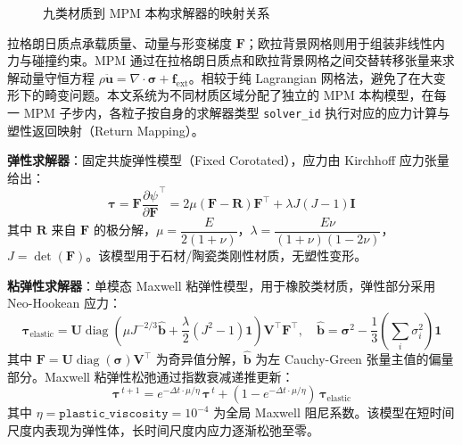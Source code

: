 \begin{figure}[!htbp]
    \centering
    \resizebox{0.88\linewidth}{!}{}
    \caption{九类材质到 MPM 本构求解器的映射关系}
    \label{fig:material_solver_mapping}
\end{figure}

拉格朗日质点承载质量、动量与形变梯度 $\mathbf{F}$；欧拉背景网格则用于组装非线性内力与碰撞约束。MPM 通过在拉格朗日质点和欧拉背景网格之间交替转移张量来求解动量守恒方程 $\rho\ddot{\mathbf{u}}=\nabla\cdot\boldsymbol{\sigma}+\mathbf{f}_{\text{ext}}$。相较于纯 Lagrangian 网格法，避免了在大变形下的畸变问题。本文系统为不同材质区域分配了独立的 MPM 本构模型，在每一 MPM 子步内，各粒子按自身的求解器类型 \texttt{solver\_id} 执行对应的应力计算与塑性返回映射（Return Mapping）。

\textbf{弹性求解器}：固定共旋弹性模型（Fixed Corotated）\cite{physgaussian}，应力由 Kirchhoff 应力张量给出：
\begin{equation}
\boldsymbol{\tau}=\mathbf{F}\frac{\partial\psi}{\partial\mathbf{F}}^\top=2\mu(\mathbf{F}-\mathbf{R})\mathbf{F}^\top+\lambda J(J-1)\mathbf{I}
\end{equation}
其中 $\mathbf{R}$ 来自 $\mathbf{F}$ 的极分解，$\mu=\dfrac{E}{2(1+\nu)}$，$\lambda=\dfrac{E\nu}{(1+\nu)(1-2\nu)}$，$J=\det(\mathbf{F})$。该模型用于石材/陶瓷类刚性材质，无塑性变形。

\textbf{粘弹性求解器}：单模态 Maxwell 粘弹性模型，用于橡胶类材质，弹性部分采用 Neo-Hookean 应力：
\begin{equation}
\boldsymbol{\tau}_{\text{elastic}}=\mathbf{U}\operatorname{diag}\!\left(\mu J^{-2/3}\hat{\mathbf{b}}+\frac{\lambda}{2}(J^2-1)\mathbf{1}\right)\mathbf{V}^{\top}\mathbf{F}^{\top},\quad
\hat{\mathbf{b}}=\boldsymbol{\sigma}^{2}-\frac{1}{3}\left(\sum_i \sigma_i^2\right)\mathbf{1}
\end{equation}
其中 $\mathbf{F}=\mathbf{U}\operatorname{diag}(\boldsymbol{\sigma})\mathbf{V}^{\top}$ 为奇异值分解，$\hat{\mathbf{b}}$ 为左 Cauchy-Green 张量主值的偏量部分。Maxwell 粘弹性松弛通过指数衰减递推更新：
\begin{equation}
\boldsymbol{\tau}^{\,t+1}=e^{-\Delta t\cdot\mu/\eta}\,\boldsymbol{\tau}^{\,t}+(1-e^{-\Delta t\cdot\mu/\eta})\,\boldsymbol{\tau}_{\text{elastic}}
\end{equation}
其中 $\eta=\texttt{plastic\_viscosity}=10^{-4}$ 为全局 Maxwell 阻尼系数。该模型在短时间尺度内表现为弹性体，长时间尺度内应力逐渐松弛至零。

